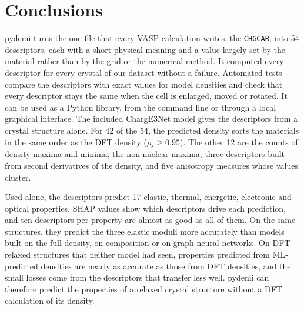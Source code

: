 \documentclass[journal=jctcce,manuscript=article,email=true]{achemso}
\newcommand{\rev}[1]{{\color{blue}#1}}
\begin{document}
\section{Conclusions}
\label{sec:conclusions}
pydemi turns the one file that every VASP calculation writes, the
\texttt{CHGCAR}, into \rev{54} descriptors, each with a short physical meaning and a
value largely set by the material rather than by the grid or the numerical
method. It computed every descriptor for every crystal of our dataset without a
failure. Automated tests compare the descriptors with exact values for model
densities and check that every descriptor stays the same when the cell is
enlarged, moved or rotated. It can be used
as a Python library, from the command line or through a local graphical
interface. The included ChargE3Net model gives the descriptors from a crystal
structure alone. For \rev{42 of the 54}, the predicted density sorts the materials in
the same order as the DFT density ($\rho_s \geq 0.95$). The other \rev{12} are the
counts of density maxima and minima, the non-nuclear maxima, \rev{three} descriptors
built from second derivatives \rev{of the density}, and five anisotropy
measures whose values cluster.

Used alone, the descriptors predict 17 elastic, thermal, energetic,
electronic and optical properties. SHAP values show which descriptors drive
each prediction, and ten descriptors per property are almost as good as all of
them. On the same structures, they predict the three elastic moduli more
accurately than models built on the full density, on composition or on graph
neural networks. On DFT-relaxed structures that neither model had seen, properties predicted from
ML-predicted densities are nearly as accurate as those from DFT densities, and
the small losses come from the descriptors that transfer less well. pydemi can
therefore predict the properties of a relaxed crystal structure without
\rev{a DFT calculation of} its density.
\end{document}
